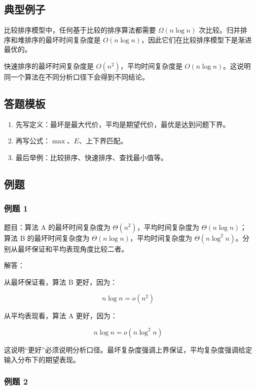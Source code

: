 \documentclass[UTF8,zihao=-4]{ctexart}
\begin{document}
\subsection*{典型例子}

比较排序模型中，任何基于比较的排序算法都需要 $\Omega(n \log n)$ 次比较。归并排序和堆排序的最坏时间复杂度是 $O(n \log n)$，因此它们在比较排序模型下是渐进最优的。

快速排序的最坏时间复杂度是 $O(n^2)$，平均时间复杂度是 $O(n \log n)$。这说明同一个算法在不同分析口径下会得到不同结论。

\subsection*{答题模板}

\begin{enumerate}
\item 先写定义：最坏是最大代价，平均是期望代价，最优是达到问题下界。
\item 再写公式：$\max$、$E$、上下界匹配。
\item 最后举例：比较排序、快速排序、查找最小值等。
\end{enumerate}

\subsection*{例题}

\subsubsection*{例题 1}

题目：算法 A 的最坏时间复杂度为 $\Theta(n^2)$，平均时间复杂度为 $\Theta(n \log n)$；算法 B 的最坏时间复杂度为 $\Theta(n \log n)$，平均时间复杂度为 $\Theta(n \log^2 n)$。分别从最坏保证和平均表现角度比较二者。

解答：

从最坏保证看，算法 B 更好，因为：

\[n \log n = o(n^{2})\]

从平均表现看，算法 A 更好，因为：

\[n \log n = o(n \log^{2} n)\]

这说明“更好”必须说明分析口径。最坏复杂度强调上界保证，平均复杂度强调给定输入分布下的期望表现。

\subsubsection*{例题 2}
\end{document}
